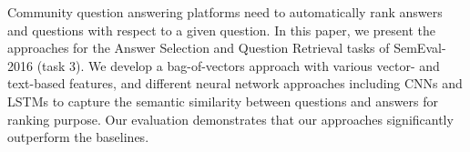 Community question answering platforms need to automatically rank answers and questions with respect to a given question. In this paper, we present the approaches for the Answer Selection and Question Retrieval tasks of SemEval-2016 (task 3). We develop a bag-of-vectors approach with various vector- and text-based features, and different neural network approaches including CNNs and LSTMs to capture the semantic similarity between questions and answers for ranking purpose. Our evaluation demonstrates that our approaches significantly outperform the baselines.
